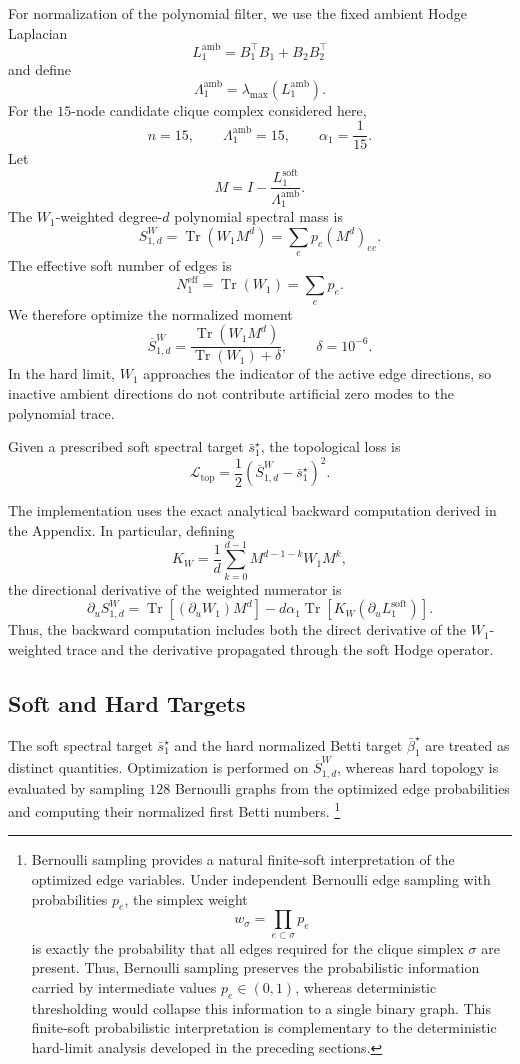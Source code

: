 \documentclass[pdflatex,sn-mathphys-num]{sn-jnl}%
\theoremstyle{thmstyleone}%
\theoremstyle{thmstyletwo}%
\theoremstyle{thmstylethree}%
\begin{document}
For normalization of the polynomial filter, we use the fixed ambient Hodge Laplacian
\[
L_1^{\mathrm{amb}}
=
B_1^\top B_1
+
B_2B_2^\top
\]
and define
\[
\Lambda_1^{\mathrm{amb}}
=
\lambda_{\max}
\left(
L_1^{\mathrm{amb}}
\right).
\]
For the \(15\)-node candidate clique complex considered here,
\[
n=15,
\qquad
\Lambda_1^{\mathrm{amb}}=15,
\qquad
\alpha_1=\frac{1}{15}.
\]
Let
\[
M
=
I-
\frac{L_1^{\mathrm{soft}}}
{\Lambda_1^{\mathrm{amb}}}.
\]
The \(W_1\)-weighted degree-\(d\) polynomial spectral mass is
\[
S_{1,d}^{W}
=
\operatorname{Tr}
\left(
W_1M^d
\right)
=
\sum_e p_e(M^d)_{ee}.
\]
The effective soft number of edges is
\[
N_1^{\mathrm{eff}}
=
\operatorname{Tr}(W_1)
=
\sum_ep_e.
\]
We therefore optimize the normalized moment
\[
\overline S_{1,d}^{W}
=
\frac{
\operatorname{Tr}
\left(
W_1M^d
\right)
}{
\operatorname{Tr}(W_1)+\delta
},
\qquad
\delta=10^{-6}.
\]
In the hard limit, \(W_1\) approaches the indicator of the active edge directions, so inactive ambient directions do not contribute artificial zero modes to the polynomial trace.

Given a prescribed soft spectral target \(\bar{s}_1^\star\), the topological loss is
\[
\mathcal L_{\mathrm{top}}
=
\frac12
\left(
\overline S_{1,d}^{W}
-
\bar{s}_1^\star
\right)^2.
\]

The implementation uses the exact analytical backward computation derived in the Appendix.
In particular, defining
\[
K_W
=
\frac1d
\sum_{k=0}^{d-1}
M^{d-1-k}W_1M^k,
\]
the directional derivative of the weighted numerator is
\[
\partial_u S_{1,d}^{W}
=
\operatorname{Tr}
\left[
(\partial_uW_1)M^d
\right]
-
d\alpha_1
\operatorname{Tr}
\left[
K_W
(\partial_uL_1^{\mathrm{soft}})
\right].
\]
Thus, the backward computation includes both the direct derivative of the \(W_1\)-weighted trace and the derivative propagated through the soft Hodge operator.


\subsection{Soft and Hard Targets}

The soft spectral target \(\bar{s}_1^\star\) and the hard normalized Betti target \(\bar{\beta}_1^\star\) are treated as distinct quantities.
Optimization is performed on \(\overline S_{1,d}^{W}\), whereas hard topology is evaluated by sampling \(128\) Bernoulli graphs from the optimized edge probabilities and computing their normalized first Betti numbers.
\footnote{
Bernoulli sampling provides a natural finite-soft interpretation of the optimized edge variables.
Under independent Bernoulli edge sampling with probabilities \(p_e\), the simplex weight
\[
w_\sigma=\prod_{e\subset\sigma}p_e
\]
is exactly the probability that all edges required for the clique simplex \(\sigma\) are present.
Thus, Bernoulli sampling preserves the probabilistic information carried by intermediate values \(p_e\in(0,1)\), whereas deterministic thresholding would collapse this information to a single binary graph.
This finite-soft probabilistic interpretation is complementary to the deterministic hard-limit analysis developed in the preceding sections.
}
\end{document}
